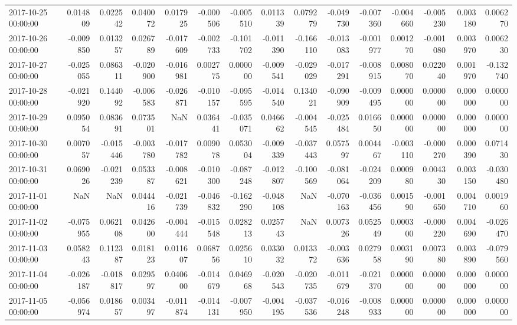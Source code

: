 \begin{tabular}{lrrrrrrrrrrrrrr}
2017-10-25 00:00:00 & 0.014809 & 0.022542 & 0.040072 & 0.017925 & -0.000506 & -0.005510 & 0.011339 & 0.079279 & -0.049730 & -0.007360 & -0.004660 & -0.005230 & 0.003180 & 0.006270 \\
2017-10-26 00:00:00 & -0.009850 & 0.013257 & 0.026789 & -0.017609 & -0.002733 & -0.101702 & -0.011390 & -0.166110 & -0.013083 & -0.001977 & 0.001270 & -0.001080 & 0.003970 & 0.006230 \\
2017-10-27 00:00:00 & -0.025055 & 0.086311 & -0.020900 & -0.016981 & 0.002775 & 0.000000 & -0.009541 & -0.029029 & -0.017291 & -0.008915 & 0.008070 & 0.022040 & 0.001970 & -0.132740 \\
2017-10-28 00:00:00 & -0.021920 & 0.144092 & -0.006583 & -0.026871 & -0.010157 & -0.095595 & -0.014540 & 0.134021 & -0.090909 & -0.009495 & 0.000000 & 0.000000 & 0.000000 & 0.000000 \\
2017-10-29 00:00:00 & 0.095054 & 0.083691 & 0.073501 & NaN & 0.036441 & -0.035071 & 0.046662 & -0.004545 & -0.025484 & 0.016650 & 0.000000 & 0.000000 & 0.000000 & 0.000000 \\
2017-10-30 00:00:00 & 0.007057 & -0.015446 & -0.003780 & -0.017782 & 0.009078 & 0.053004 & -0.009339 & -0.037443 & 0.057597 & 0.004467 & -0.003110 & -0.000270 & 0.000390 & 0.071430 \\
2017-10-31 00:00:00 & 0.069026 & -0.021239 & 0.053387 & -0.008621 & -0.010300 & -0.087248 & -0.012807 & -0.100569 & -0.081064 & -0.024209 & 0.000980 & 0.004330 & 0.003150 & -0.030480 \\
2017-11-01 00:00:00 & NaN & NaN & 0.044416 & -0.021739 & -0.046832 & -0.162290 & -0.048108 & NaN & -0.070163 & -0.036456 & 0.001590 & -0.001650 & 0.004710 & 0.001960 \\
2017-11-02 00:00:00 & -0.075955 & 0.062108 & 0.042600 & -0.004444 & -0.015548 & 0.028213 & 0.025743 & NaN & 0.007326 & 0.052549 & 0.000300 & -0.000220 & 0.004690 & -0.026470 \\
2017-11-03 00:00:00 & 0.058243 & 0.112387 & 0.018123 & 0.011607 & 0.068756 & 0.025610 & 0.033032 & 0.013372 & -0.003636 & 0.027958 & 0.003190 & 0.007380 & 0.003890 & -0.079560 \\
2017-11-04 00:00:00 & -0.026187 & -0.018817 & 0.029597 & 0.040600 & -0.014679 & 0.046968 & -0.020543 & -0.020735 & -0.011679 & -0.021370 & 0.000000 & 0.000000 & 0.000000 & 0.000000 \\
2017-11-05 00:00:00 & -0.056974 & 0.018657 & 0.003497 & -0.011874 & -0.014131 & -0.007950 & -0.004195 & -0.037536 & -0.016248 & -0.008933 & 0.000000 & 0.000000 & 0.000000 & 0.000000 \\

\end{tabular}
